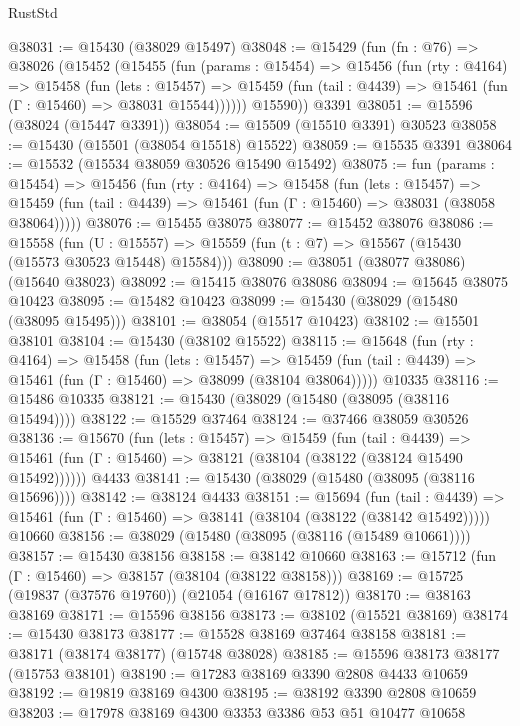 \begin{lexlean}{RustStd}
\begin{coremodule}
{\begin{coremodule}
{{{{{{{{{{{{{{{{{{{{{{{{{{{{{{{{{{{{{{{{{{{{{{{{{{{{{{{{{{{{@38031 := @15430 (@38029 @15497)
@38048 := @15429
    (fun (fn : @76) =>
    @38026
      (@15452
        (@15455
          (fun (params : @15454) =>
          @15456
            (fun (rty : @4164) =>
            @15458
              (fun (lets : @15457) =>
              @15459 (fun (tail : @4439) => @15461 (fun (Γ : @15460) => @38031 @15544))))))
        @15590))
    @3391
@38051 := @15596 (@38024 (@15447 @3391))
@38054 := @15509 (@15510 @3391) @30523
@38058 := @15430 (@15501 (@38054 @15518) @15522)
@38059 := @15535 @3391
@38064 := @15532 (@15534 @38059 @30526 @15490 @15492)
@38075 := fun (params : @15454) =>
  @15456
    (fun (rty : @4164) =>
    @15458
      (fun (lets : @15457) =>
      @15459 (fun (tail : @4439) => @15461 (fun (Γ : @15460) => @38031 (@38058 @38064)))))
@38076 := @15455 @38075
@38077 := @15452 @38076
@38086 := @15558
    (fun (U : @15557) => @15559 (fun (t : @7) => @15567 (@15430 (@15573 @30523 @15448) @15584)))
@38090 := @38051 (@38077 @38086) (@15640 @38023)
@38092 := @15415 @38076 @38086
@38094 := @15645 @38075 @10423
@38095 := @15482 @10423
@38099 := @15430 (@38029 (@15480 (@38095 @15495)))
@38101 := @38054 (@15517 @10423)
@38102 := @15501 @38101
@38104 := @15430 (@38102 @15522)
@38115 := @15648
    (fun (rty : @4164) =>
    @15458
      (fun (lets : @15457) =>
      @15459 (fun (tail : @4439) => @15461 (fun (Γ : @15460) => @38099 (@38104 @38064)))))
    @10335
@38116 := @15486 @10335
@38121 := @15430 (@38029 (@15480 (@38095 (@38116 @15494))))
@38122 := @15529 @37464
@38124 := @37466 @38059 @30526
@38136 := @15670
    (fun (lets : @15457) =>
    @15459
      (fun (tail : @4439) =>
      @15461 (fun (Γ : @15460) => @38121 (@38104 (@38122 (@38124 @15490 @15492))))))
    @4433
@38141 := @15430 (@38029 (@15480 (@38095 (@38116 @15696))))
@38142 := @38124 @4433
@38151 := @15694
    (fun (tail : @4439) => @15461 (fun (Γ : @15460) => @38141 (@38104 (@38122 (@38142 @15492)))))
    @10660
@38156 := @38029 (@15480 (@38095 (@38116 (@15489 @10661))))
@38157 := @15430 @38156
@38158 := @38142 @10660
@38163 := @15712 (fun (Γ : @15460) => @38157 (@38104 (@38122 @38158)))
@38169 := @15725 (@19837 (@37576 @19760)) (@21054 (@16167 @17812))
@38170 := @38163 @38169
@38171 := @15596 @38156
@38173 := @38102 (@15521 @38169)
@38174 := @15430 @38173
@38177 := @15528 @38169 @37464 @38158
@38181 := @38171 (@38174 @38177) (@15748 @38028)
@38185 := @15596 @38173 @38177 (@15753 @38101)
@38190 := @17283 @38169 @3390 @2808 @4433 @10659
@38192 := @19819 @38169 @4300
@38195 := @38192 @3390 @2808 @10659
@38203 := @17978 @38169 @4300 @3353 @3386 @53 @51 @10477 @10658
}}}}}}}}}}}}}}}}}}}}}}}}}}}}}}}}}}}}}}}}}}}}}}}}}}}}}}}}}}}}
\end{coremodule}}
\end{coremodule}
\end{lexlean}
